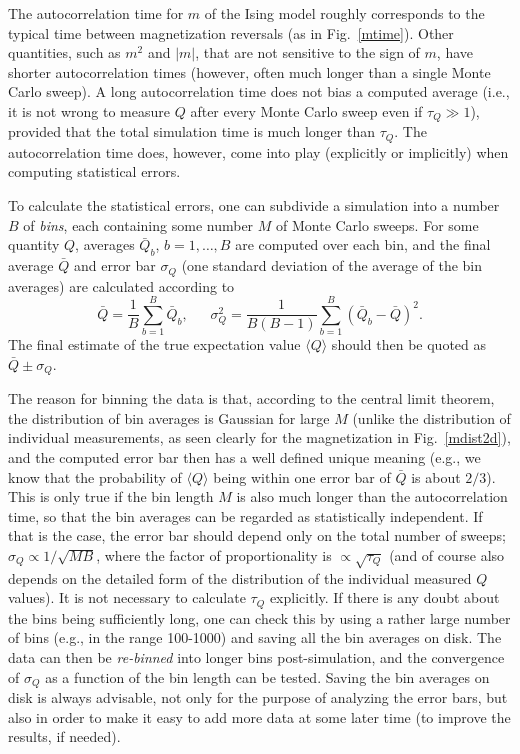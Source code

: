 \documentclass[draft,numberedheadings]{aipproc}
\begin{document}
The autocorrelation time for $m$ of the Ising model roughly corresponds to the typical time between magnetization reversals (as in Fig.~\ref{mtime}). 
Other quantities, such as $m^2$ and $|m|$, that are not sensitive to the sign of $m$, have shorter autocorrelation times (however, often much longer 
than a single Monte Carlo sweep). A long autocorrelation time does not bias a computed average (i.e., it is not wrong to measure $Q$ after every Monte 
Carlo sweep even if $\tau_Q \gg 1$), provided that the total simulation time is much longer than $\tau_Q$. The autocorrelation time does, however, 
come into play (explicitly or implicitly) when computing statistical errors.

To calculate the statistical errors, one can subdivide a simulation into a number $B$ of {\it bins}, each containing some number 
$M$ of Monte Carlo sweeps. For some quantity $Q$, averages  $\bar Q_b$, $b=1,\ldots,B$ are computed over each bin, and the final average $\bar Q$ and 
error bar $\sigma_Q$ (one standard deviation of the average of the bin averages) are calculated according to
\begin{equation}
\bar Q = \frac{1}{B}\sum_{b=1}^B \bar Q_b,~~~~~~~\sigma^2_Q = \frac{1}{B(B-1)}\sum_{b=1}^B (\bar Q_b - \bar Q)^2.
\end{equation}
The final estimate of the true expectation value $\langle Q\rangle$ should then be quoted as $\bar Q \pm \sigma_Q$. 

The reason for binning the data is that, according to the central limit theorem, the distribution of bin averages is Gaussian for large $M$ (unlike 
the distribution of individual measurements, as seen clearly for the magnetization in Fig.~\ref{mdist2d}), and the computed error bar then
has a well defined unique meaning (e.g., we know that the probability of $\langle Q\rangle$ being within one error bar of $\bar Q$ is about 
$2/3$). This is only true if the bin length $M$ is also much longer than the autocorrelation time, so that the bin averages can be regarded as 
statistically independent. If that is the case, the error bar should depend only on the total number of sweeps; $\sigma_Q \propto 1/\sqrt{MB}$, 
where the factor of proportionality is $\propto \sqrt{\tau_Q}$ (and of course also depends on the detailed form of the distribution of the 
individual measured $Q$ values). It is not necessary to calculate $\tau_Q$ explicitly. If there is any doubt about the bins being sufficiently long,
one can check this by using a rather large number of bins (e.g., in the range 100-1000) and saving all the bin averages on disk. The data can then 
be  {\it re-binned} into longer bins post-simulation, and the convergence of $\sigma_Q$  as a function of the bin length can be tested. Saving the 
bin averages on disk is always advisable, not only for the purpose of analyzing the error bars, but also in order to make it easy to add more data 
at some later time (to improve the results, if needed). 
\end{document}
